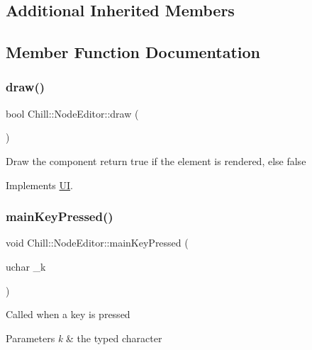 \subsection*{Additional Inherited Members}


\subsection{Member Function Documentation}
\mbox{\label{class_chill_1_1_node_editor_a7b67d5473c93d3258a2dc565e76da024}} 
\subsubsection{\texorpdfstring{draw()}{draw()}}
{\footnotesize\ttfamily bool Chill\+::\+Node\+Editor\+::draw (\begin{DoxyParamCaption}{ }\end{DoxyParamCaption})\hspace{0.3cm}{\ttfamily [virtual]}}

Draw the component return true if the element is rendered, else false 

Implements \mbox{\hyperlink{class_u_i_a5025b88e26f21852c0cd2e4b42675c50}{UI}}.

\mbox{\label{class_chill_1_1_node_editor_a0abdd4a4d4026177be77a8e59f4aa5cf}} 
\subsubsection{\texorpdfstring{main\+Key\+Pressed()}{mainKeyPressed()}}
{\footnotesize\ttfamily void Chill\+::\+Node\+Editor\+::main\+Key\+Pressed (\begin{DoxyParamCaption}\item[{uchar}]{\+\_\+k }\end{DoxyParamCaption})\hspace{0.3cm}{\ttfamily [static]}}

Called when a key is pressed 
\begin{DoxyParams}{Parameters}
{\em k} & the typed character \\
\hline
\end{DoxyParams}
\mbox{\label{class_chill_1_1_node_editor_a94f29235392656e4c60c3aa0d81c646a}} 
